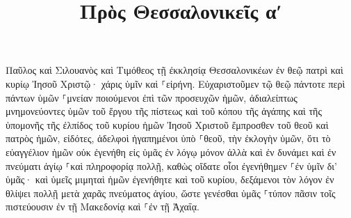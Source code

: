 \documentclass{openreader}
\title{Πρὸς Θεσσαλονικεῖς αʹ}
\date{}
\begin{document}
\maketitle
\raggedbottom 
\fontsize{16pt}{24pt}\selectfont


Παῦλος καὶ Σιλουανὸς καὶ Τιμόθεος τῇ ἐκκλησίᾳ Θεσσαλονικέων ἐν θεῷ πατρὶ καὶ κυρίῳ Ἰησοῦ Χριστῷ· χάρις ὑμῖν καὶ ⸀εἰρήνη. 
Εὐχαριστοῦμεν τῷ θεῷ πάντοτε περὶ πάντων ὑμῶν ⸀μνείαν ποιούμενοι ἐπὶ τῶν προσευχῶν ἡμῶν, ἀδιαλείπτως 
μνημονεύοντες ὑμῶν τοῦ ἔργου τῆς πίστεως καὶ τοῦ κόπου τῆς ἀγάπης καὶ τῆς ὑπομονῆς τῆς ἐλπίδος τοῦ κυρίου ἡμῶν Ἰησοῦ Χριστοῦ ἔμπροσθεν τοῦ θεοῦ καὶ πατρὸς ἡμῶν, 
εἰδότες, ἀδελφοὶ ἠγαπημένοι ὑπὸ ⸀θεοῦ, τὴν ἐκλογὴν ὑμῶν, 
ὅτι τὸ εὐαγγέλιον ἡμῶν οὐκ ἐγενήθη εἰς ὑμᾶς ἐν λόγῳ μόνον ἀλλὰ καὶ ἐν δυνάμει καὶ ἐν πνεύματι ἁγίῳ ⸀καὶ πληροφορίᾳ πολλῇ, καθὼς οἴδατε οἷοι ἐγενήθημεν ⸀ἐν ὑμῖν δι’ ὑμᾶς· 
καὶ ὑμεῖς μιμηταὶ ἡμῶν ἐγενήθητε καὶ τοῦ κυρίου, δεξάμενοι τὸν λόγον ἐν θλίψει πολλῇ μετὰ χαρᾶς πνεύματος ἁγίου, 
ὥστε γενέσθαι ὑμᾶς ⸀τύπον πᾶσιν τοῖς πιστεύουσιν ἐν τῇ Μακεδονίᾳ καὶ ⸀ἐν τῇ Ἀχαΐᾳ. 
\end{document}
